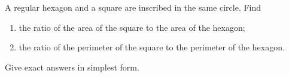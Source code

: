 A regular hexagon and a square are inscribed in the same circle. Find
\begin{enumerate}
\item[(a)] the ratio of the area of the square to the area of the hexagon;
\item[(b)] the ratio of the perimeter of the square to the perimeter of the hexagon.
\end{enumerate}
Give exact answers in simplest form.
